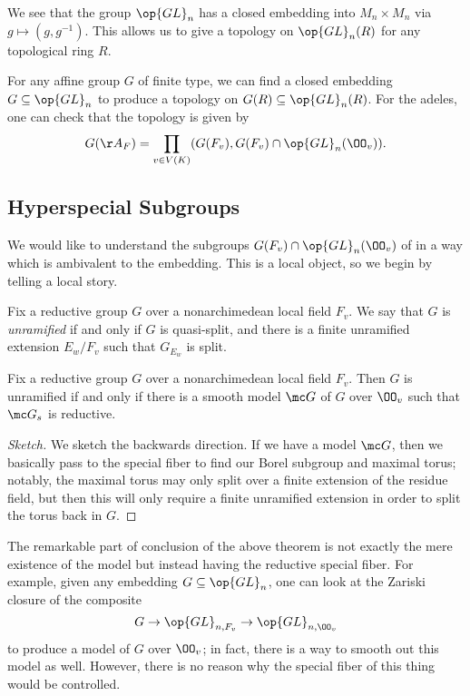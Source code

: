 \documentclass{article}
\begin{document}
\begin{example}
	We see that the group $\op{GL}_n$ has a closed embedding into $M_n\times M_n$ via $g\mapsto\left(g,g^{-1}\right)$. This allows us to give a topology on $\op{GL}_n(R)$ for any topological ring $R$.
\end{example}
\begin{example} \label{ex:topology-on-g-adeles}
	For any affine group $G$ of finite type, we can find a closed embedding $G\subseteq\op{GL}_n$ to produce a topology on $G(R)\subseteq\op{GL}_n(R)$. For the adeles, one can check that the topology is given by
	\[G(\AA_F)=\prod_{v\in V(K)}(G(F_v),G(F_v)\cap\op{GL}_n(\OO_v)).\]
\end{example}

\subsection{Hyperspecial Subgroups}
We would like to understand the subgroups $G(F_v)\cap\op{GL}_n(\OO_v)$ of  in a way which is ambivalent to the embedding. This is a local object, so we begin by telling a local story.
\begin{definition}[unramified]
	Fix a reductive group $G$ over a nonarchimedean local field $F_v$. We say that $G$ is \textit{unramified} if and only if $G$ is quasi-split, and there is a finite unramified extension $E_w/F_v$ such that $G_{E_w}$ is split.
\end{definition}
\begin{theorem}
	Fix a reductive group $G$ over a nonarchimedean local field $F_v$. Then $G$ is unramified if and only if there is a smooth model $\mc G$ of $G$ over $\OO_v$ such that $\mc G_s$ is reductive.
\end{theorem}
\begin{proof}[Sketch]
	We sketch the backwards direction. If we have a model $\mc G$, then we basically pass to the special fiber to find our Borel subgroup and maximal torus; notably, the maximal torus may only split over a finite extension of the residue field, but then this will only require a finite unramified extension in order to split the torus back in $G$.
\end{proof}
The remarkable part of conclusion of the above theorem is not exactly the mere existence of the model but instead having the reductive special fiber. For example, given any embedding $G\subseteq\op{GL}_n$, one can look at the Zariski closure of the composite
\[G\to{\op{GL}_{n,F_v}}\to{\op{GL}_{n,\OO_v}}\]
to produce a model of $G$ over $\OO_v$; in fact, there is a way to smooth out this model as well. However, there is no reason why the special fiber of this thing would be controlled.
\end{document}
